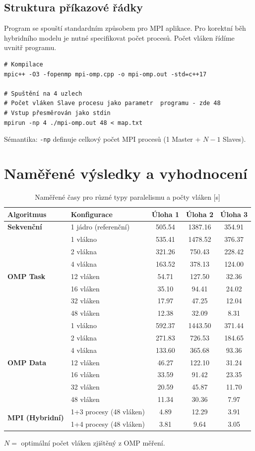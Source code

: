\documentclass[11pt,a4paper]{article}
\begin{document}
\subsection{Struktura příkazové řádky}
Program se spouští standardním způsobem pro MPI aplikace. Pro korektní běh hybridního modelu je nutné specifikovat počet procesů. Počet vláken řídíme uvnitř programu.
\begin{verbatim}
# Kompilace
mpic++ -O3 -fopenmp mpi-omp.cpp -o mpi-omp.out -std=c++17

# Spuštění na 4 uzlech
# Počet vláken Slave procesu jako parametr  programu - zde 48
# Vstup přesměrován jako stdin
mpirun -np 4 ./mpi-omp.out 48 < map.txt
\end{verbatim}
Sémantika: \texttt{-np} definuje celkový počet MPI procesů (1 Master + $N-1$ Slaves).

\newpage
\section{Naměřené výsledky a vyhodnocení}
\begin{table}[h]
\centering
\caption{Naměřené časy pro různé typy paralelismu a počty vláken [s]}
\label{tab:mereni_paralelismu}
\begin{tabular}{@{}llccc@{}}
\toprule
\textbf{Algoritmus} & \textbf{Konfigurace} & \textbf{Úloha 1} & \textbf{Úloha 2} & \textbf{Úloha 3} \\ \midrule
\textbf{Sekvenční} & 1 jádro (referenční) & 505.54 & 1387.16 & 354.91 \\ \midrule
\multirow{7}{*}{\textbf{OMP Task}} & 1 vlákno & 535.41 & 1478.52 & 376.37 \\
 & 2 vlákna & 321.26 & 750.43 & 228.42 \\
 & 4 vlákna & 163.52 & 378.13 & 124.00 \\
 & 12 vláken & 54.71 & 127.50 & 32.36 \\
 & 16 vláken & 35.10 & 94.41 &  24.02 \\
 & 32 vláken & 17.97 & 47.25 &  12.04 \\
 & 48 vláken & 12.38 & 32.09 & 8.31 \\ \midrule
\multirow{7}{*}{\textbf{OMP Data}} & 1 vlákno & 592.37 & 1443.50 & 371.44 \\
 & 2 vlákna & 271.83 & 726.53 & 184.65 \\
 & 4 vlákna & 133.60 & 365.68 & 93.36 \\
 & 12 vláken & 46.27 & 122.10 & 31.24 \\
 & 16 vláken & 33.59 & 91.42 & 23.35 \\
 & 32 vláken & 20.59 & 45.87 & 11.70 \\
 & 48 vláken & 11.34 & 30.36 & 7.97 \\ \midrule
\multirow{2}{*}{\textbf{MPI (Hybridní)}} & 1+3 procesy (48 vláken) & 4.89 & 12.29 & 3.91 \\
 & 1+4 procesy (48 vláken) & 3.81 & 9.64 & 3.05 \\ \bottomrule
\end{tabular}
\par\smallskip
\small * $N = $ optimální počet vláken zjištěný z OMP měření.
\end{table}
\end{document}
